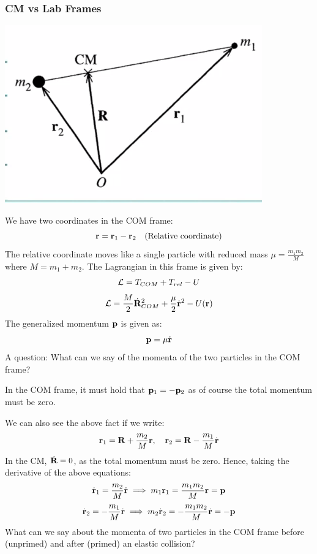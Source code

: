 \documentclass[../PHYS306Notes.tex]{subfiles}
\begin{document}
\subsubsection{CM vs Lab Frames}
\begin{center}
    \includegraphics[scale=0.5]{Lecture-29/l29-img1.png}
\end{center}
We have two coordinates in the COM frame:
\[\mathbf{r} = \mathbf{r}_1 - \mathbf{r}_2 \quad \text{(Relative coordinate)}\]
The relative coordinate moves like a single particle with reduced mass $\mu = \frac{m_1m_2}{M}$ where $M = m_1 + m_2$. The Lagrangian in this frame is given by:
\[\mathcal{L} = T_{COM} + T_{rel} - U\]
\[\mathcal{L} = \frac{M}{2}\dot{\mathbf{R}}_{COM}^2 + \frac{\mu}{2}\dot{\mathbf{r}}^2 - U(\mathbf{r})\]
The generalized momentum $\mathbf{p}$ is given as:
\[\mathbf{p} = \mu \dot{\mathbf{r}}\]
A question: What can we say of the momenta of the two particles in the COM frame?
\begin{s}
In the COM frame, it must hold that $\mathbf{p}_1 = -\mathbf{p}_2$ as of course the total momentum must be zero.
\end{s}
We can also see the above fact if we write:
\[\mathbf{r}_1 = \mathbf{R} + \frac{m_2}{M}\mathbf{r}, \quad \mathbf{r}_2 = \mathbf{R} - \frac{m_1}{M}\dot{\mathbf{r}}\]
In the CM, $\dot{\mathbf{R}} = 0$, as the total momentum must be zero. Hence, taking the derivative of the above equations:
\[\dot{\mathbf{r}}_1 = \frac{m_2}{M}\dot{\mathbf{r}} \implies m_1\mathbf{r}_1 = \frac{m_1m_2}{M}\mathbf{r} = \mathbf{p}\]
\[\dot{\mathbf{r}}_2 = - \frac{m_1}{M}\dot{\mathbf{r}} \implies m_2\dot{\mathbf{r}}_2 = - \frac{m_1m_2}{M}\dot{\mathbf{r}} = -\mathbf{p}\]
What can we say about the momenta of two particles in the COM frame before (unprimed) and after (primed) an elastic collision?
\end{document}
